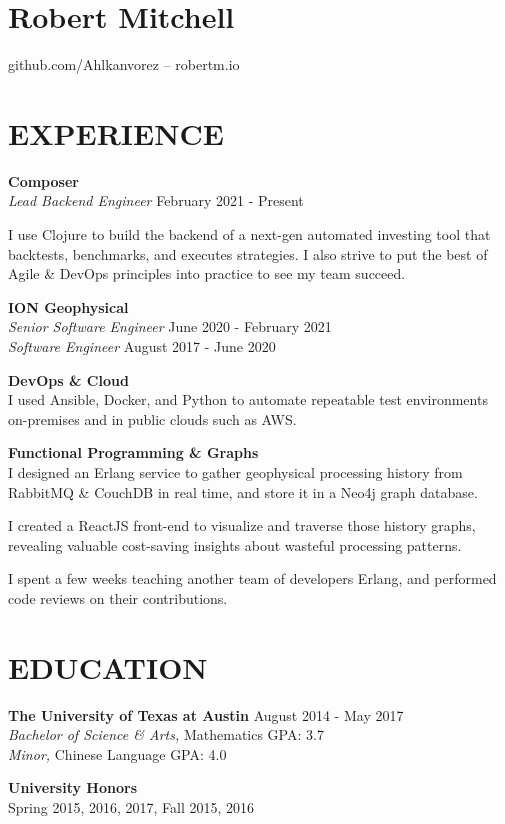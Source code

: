 \documentclass[line,margin]{res}
\begin{document}
\section{Robert Mitchell}
\hfill github.com/Ahlkanvorez -- robertm.io
\address{robert.mitchell36@gmail.com}

\begin{resume}

\section{EXPERIENCE}
    \textbf{Composer} \\
    \textit{Lead Backend Engineer}
    \hfill February 2021 - Present

    I use Clojure to build the backend of a next-gen automated investing
    tool that backtests, benchmarks, and executes strategies. I also strive to
    put the best of Agile \& DevOps principles into practice to see my team succeed.

    \textbf{ION Geophysical} \\
    \textit{Senior Software Engineer}
    \hfill June 2020 - February 2021 \\
    \textit{Software Engineer}
    \hfill August 2017 - June 2020

    \textbf{DevOps \& Cloud} \\
    I used Ansible, Docker, and Python to automate repeatable test environments
    on-premises and in public clouds such as AWS.

    \textbf{Functional Programming \& Graphs} \\
    I designed an Erlang service to gather geophysical processing history from
    RabbitMQ \& CouchDB in real time, and store it in a Neo4j graph database.

    I created a ReactJS front-end to visualize and traverse those history graphs,
    revealing valuable cost-saving insights about wasteful processing patterns.

    I spent a few weeks teaching another team of developers Erlang, and performed
    code reviews on their contributions. \\

    
\section{EDUCATION}
    \textbf{The University of Texas at Austin} 	\hfill August 2014 - May 2017 \\
    \textit{Bachelor of Science \& Arts,} Mathematics \hfill GPA: 3.7 \\
    \textit{Minor,} Chinese Language \hfill GPA:    4.0
    \begin{description}
        \item \textbf{University Honors} \hfill \\
            Spring 2015, 2016, 2017, Fall 2015, 2016 \\
    \end{description}



\end{resume}
\end{document}
